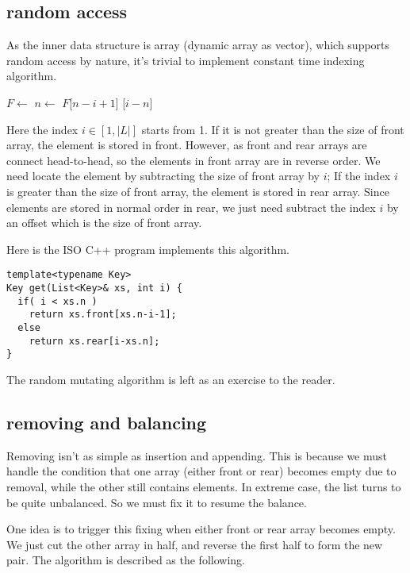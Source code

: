 \documentclass[UTF8]{article}
\begin{document}
\subsection{random access}
As the inner data structure is array (dynamic array as vector), which supports random access
by nature, it's trivial to implement constant time indexing algorithm.

\begin{algorithmic}
  \State $F \gets $ 
  \State $n \gets $ 
    \State \Return $F$[$n-i+1$]
  \Else
    \State {}[$i-n$]
  \EndIf
\EndFunction
\end{algorithmic}

Here the index $i \in [1, |L|]$ starts from 1. If it is not greater than the size of front
array, the element is stored in front. However, as front and rear arrays are connect head-to-head,
so the elements in front array are in reverse order. We need locate the element by subtracting
the size of front array by $i$; If the index $i$ is greater than the size of front array,
the element is stored in rear array. Since elements are stored in normal order in rear,
we just need subtract the index $i$ by an offset which is the size of front array.

Here is the ISO C++ program implements this algorithm.

\begin{lstlisting}
template<typename Key>
Key get(List<Key>& xs, int i) {
  if( i < xs.n )
    return xs.front[xs.n-i-1];
  else
    return xs.rear[i-xs.n];
}
\end{lstlisting}

The random mutating algorithm is left as an exercise to the reader.

\subsection{removing and balancing}
Removing isn't as simple as insertion and appending. This is because we must handle the
condition that one array (either front or rear) becomes empty due to removal, while the
other still contains elements. In extreme case, the list turns to be quite unbalanced.
So we must fix it to resume the balance.

One idea is to trigger this fixing when either front or rear array becomes empty. We just
cut the other array in half, and reverse the first half to form the new pair. The algorithm
is described as the following.
\end{document}
